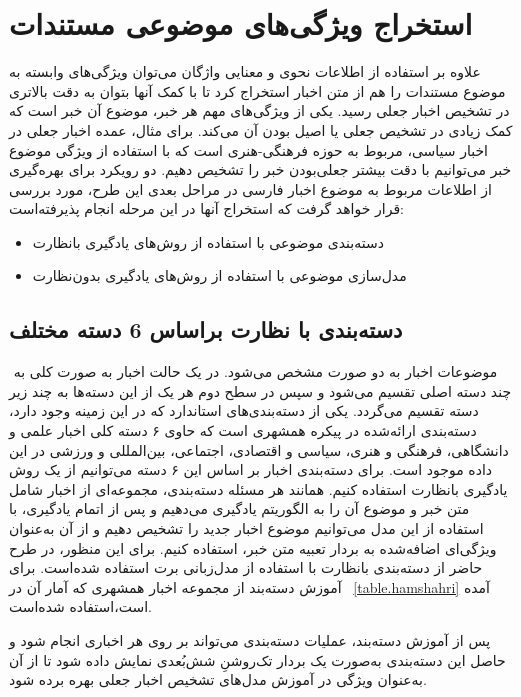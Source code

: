 \section{استخراج ویژگی‌های موضوعی مستندات}
علاوه بر استفاده از اطلاعات نحوی و معنایی واژگان می‌توان ویژگی‌های وابسته به موضوع مستندات را هم از متن اخبار استخراج کرد تا با کمک آنها بتوان به دقت بالاتری در تشخیص اخبار جعلی رسید. یکی از ویژگی‌های مهم هر خبر، موضوع آن خبر است که کمک زیادی در تشخیص جعلی یا اصیل بودن آن‌ می‌کند. برای مثال، عمده اخبار جعلی در اخبار سیاسی، مربوط به حوزه فرهنگی-هنری است که با استفاده از ویژگی موضوع خبر می‌توانیم با دقت بیشتر جعلی‌بودن خبر را تشخیص دهیم. دو رویکرد برای بهره‌گیری از اطلاعات مربوط به موضوع اخبار فارسی در مراحل بعدی این طرح، مورد بررسی قرار خواهد گرفت که استخراج آنها در این مرحله انجام پذیرفته‌است:
\begin{itemize}
	\item دسته‌بندی موضوعی با استفاده از روش‌های یادگیری با‌نظارت
	\item مدل‌سازی موضوعی با استفاده از روش‌های یادگیری بدون‌نظارت
\end{itemize}

\subsection{دسته‌بندی با‌ نظارت براساس 6 دسته مختلف}‌
موضوعات اخبار به دو صورت مشخص می‌شود. در یک حالت اخبار به صورت کلی به چند دسته اصلی تقسیم می‌شود و سپس در سطح دوم هر یک از این دسته‌ها به چند زیر دسته تقسیم می‌گردد. یکی از دسته‌بندی‌های استاندارد که در این زمینه وجود دارد، دسته‌بندی ارائه‌شده در پیکره همشهری است \citep{aleahmad2009hamshahri} که حاوی ۶ دسته کلی اخبار علمی و دانشگاهی، فرهنگی و هنری، سیاسی و اقتصادی، اجتماعی، بین‌المللی و ورزشی در این داده موجود است. برای دسته‌بندی اخبار بر اساس این ۶ دسته می‌توانیم از یک روش یادگیری بانظارت استفاده کنیم. همانند هر مسئله دسته‌بندی، مجموعه‌ای از اخبار شامل متن خبر و موضوع آن را به الگوریتم یادگیری می‌دهیم و پس از اتمام یادگیری، با استفاده از این مدل می‌توانیم موضوع اخبار جدید را تشخیص دهیم و از آن به‌عنوان ویژگی‌ای اضافه‌شده به بردار تعبیه متن خبر، استفاده کنیم. برای این منظور، در طرح حاضر از دسته‌بندی بانظارت با استفاده از مدل‌زبانی برت استفاده شده‌است. برای آموزش دسته‌بند از مجموعه اخبار همشهری که آمار آن در \tablename~\ref{table.hamshahri} آمده است،‌استفاده شده‌است.

پس‌ از آموزش دسته‌بند، عملیات دسته‌بندی می‌تواند بر روی هر اخباری انجام شود و حاصل این دسته‌بندی به‌صورت یک بردار تک‌روشنِ شش‌بُعدی نمایش داده شود تا از آن به‌عنوان ویژگی در آموزش مدل‌های تشخیص اخبار جعلی بهره برده شود.

